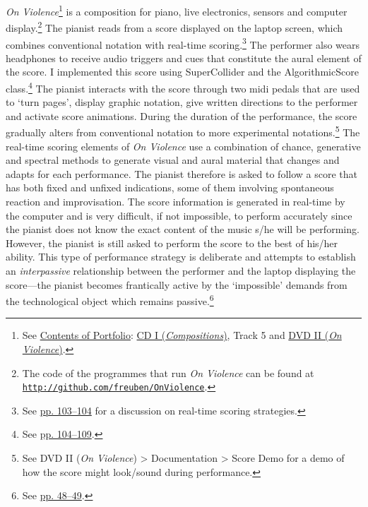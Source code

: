 \emph{On Violence}\footnote{See \hyperlink{portfolio}{Contents of Portfolio}: \href{http://www.federicoreuben.com/phd/?page_id=26}{CD I (\emph{Compositions})}, Track 5 and \href{http://www.federicoreuben.com/phd/onviolence}{DVD II (\emph{On Violence})}.} is a composition for piano, live electronics, sensors and computer display.\footnote{The code of the programmes that run \emph{On Violence} can be found at \href{http://github.com/freuben/OnViolence}{\texttt {http://github.com/freuben/OnViolence}}.} The pianist reads from a score displayed on the laptop screen, which combines conventional notation with real-time scoring.\footnote{See \hyperlink{realtimescore}{pp. 103--104} for a discussion on real-time scoring strategies.} The performer also wears headphones to receive audio triggers and cues that constitute the aural element of the score. I implemented this score using SuperCollider and the AlgorithmicScore class.\footnote{See \hyperlink{algoscore}{pp. 104--109}.} The pianist interacts with the score through two midi pedals that are used to `turn pages', display graphic notation, give written directions to the performer and activate score animations. During the duration of the performance, the score gradually alters from conventional notation to more experimental notations.\footnote{See DVD II (\emph{On Violence}) \tiny \textgreater \footnotesize \hspace{0pt} Documentation \tiny \textgreater \footnotesize \hspace{0pt} Score Demo for a demo of how the score might look/sound during performance.} The real-time scoring elements of \emph{On Violence} use a combination of chance, generative and spectral methods to generate visual and aural material that changes and adapts for each performance. The pianist therefore is asked to follow a score that has both fixed and unfixed indications, some of them involving spontaneous reaction and improvisation. The score information is generated in real-time by the computer and is very difficult, if not impossible, to perform accurately since the pianist does not know the exact content of the music s/he will be performing. However, the pianist is still asked to perform the score to the best of his/her ability. This type of performance strategy is deliberate and attempts to establish an \emph{interpassive} relationship between the performer and the laptop displaying the score---the pianist becomes frantically active by the `impossible' demands from the technological object which remains passive.\footnote{See \hyperlink{zizekinterpassiv}{pp. 48--49}.}

